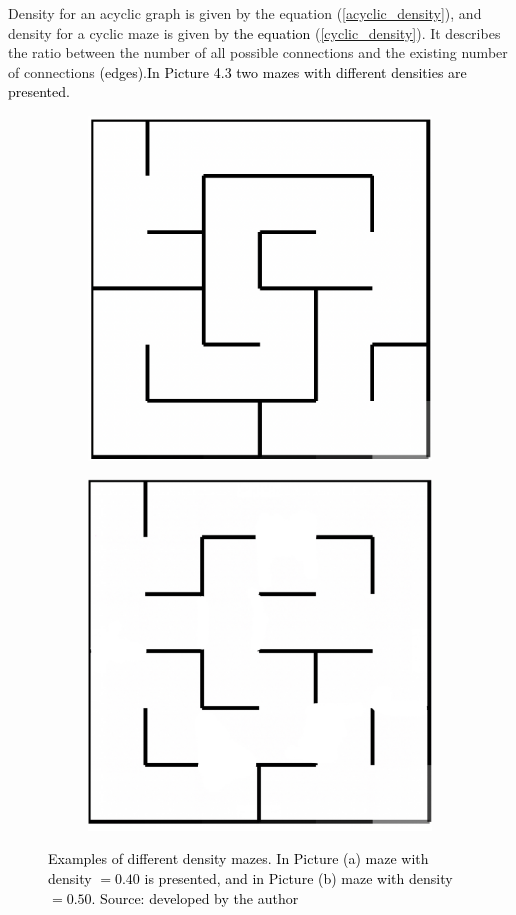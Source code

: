  Density for an acyclic graph is given by the equation (\ref{acyclic_density}), and density for a cyclic maze is given by \textcolor{black}{the equation} (\ref{cyclic_density})\cite{SBorg}. It describes the ratio between the number of all possible connections and the existing number of connections \textcolor{black}{(edges)}.\textcolor{black}{In Picture 4.3 two mazes with different densities are presented.}
\begin{figure}[!h]
\centering
\begin{subfigure}{.5\textwidth}
\centering
\includegraphics[width=.5\linewidth]{recursivedens}
\caption{}
\label{fig:sub1}
\end{subfigure}%
\begin{subfigure}{.5\textwidth}
\centering
\includegraphics[width=.5\linewidth]{recursivedensecyclic}
\caption{}
\label{fig:sub2}
\end{subfigure}
\caption{\textcolor{black}{Examples of different density mazes. In Picture (a) maze with density $= 0.40$ is presented, and in Picture (b) maze with density $ = 0.50$. Source: developed by the author}}
\label{fig:test}
\end{figure}

\newpage
